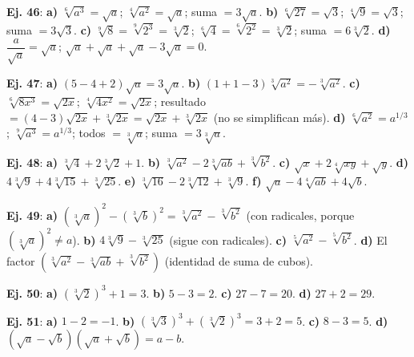 \documentclass[11pt, letterpaper]{article}
\begin{document}
\begin{tcolorbox}[answerbox, title={Bloque L — Reducción con simplificación de índice previa}]

\noindent\textbf{Ej. 46}: \textbf{a)} $\sqrt[6]{a^3}=\sqrt{a}$; $\sqrt[4]{a^2}=\sqrt{a}$; suma $=3\sqrt{a}$. \textbf{b)} $\sqrt[6]{27}=\sqrt{3}$; $\sqrt[4]{9}=\sqrt{3}$; suma $=3\sqrt{3}$. \textbf{c)} $\sqrt[9]{8}=\sqrt[9]{2^3}=\sqrt[3]{2}$; $\sqrt[6]{4}=\sqrt[6]{2^2}=\sqrt[3]{2}$; suma $=6\sqrt[3]{2}$. \textbf{d)} $\dfrac{a}{\sqrt{a}}=\sqrt{a}$; $\sqrt{a}+\sqrt{a}+\sqrt{a}-3\sqrt{a}=0$.

\medskip

\noindent\textbf{Ej. 47}: \textbf{a)} $(5-4+2)\sqrt{a}=3\sqrt{a}$. \textbf{b)} $(1+1-3)\sqrt[3]{a^2}=-\sqrt[3]{a^2}$. \textbf{c)} $\sqrt[6]{8x^3}=\sqrt{2x}$; $\sqrt[4]{4x^2}=\sqrt{2x}$; resultado $=(4-3)\sqrt{2x}+\sqrt[3]{2x}=\sqrt{2x}+\sqrt[3]{2x}$ (no se simplifican más). \textbf{d)} $\sqrt[6]{a^2}=a^{1/3}$; $\sqrt[9]{a^3}=a^{1/3}$; todos $=\sqrt[3]{a}$; suma $=3\sqrt[3]{a}$.
\end{tcolorbox}

\medskip

\begin{tcolorbox}[answerbox, title={Bloque M — Multiplicación con índices superiores}]

\noindent\textbf{Ej. 48}: \textbf{a)} $\sqrt[3]{4}+2\sqrt[3]{2}+1$. \textbf{b)} $\sqrt[3]{a^2}-2\sqrt[3]{ab}+\sqrt[3]{b^2}$. \textbf{c)} $\sqrt{x}+2\sqrt[4]{xy}+\sqrt{y}$. \textbf{d)} $4\sqrt[3]{9}+4\sqrt[3]{15}+\sqrt[3]{25}$. \textbf{e)} $\sqrt[3]{16}-2\sqrt[3]{12}+\sqrt[3]{9}$. \textbf{f)} $\sqrt{a}-4\sqrt[4]{ab}+4\sqrt{b}$.

\medskip

\noindent\textbf{Ej. 49}: \textbf{a)} $(\sqrt[3]{a})^2-(\sqrt[3]{b})^2=\sqrt[3]{a^2}-\sqrt[3]{b^2}$ (con radicales, porque $(\sqrt[3]{a})^2\neq a$). \textbf{b)} $4\sqrt[3]{9}-\sqrt[3]{25}$ (sigue con radicales). \textbf{c)} $\sqrt[5]{a^2}-\sqrt[5]{b^2}$. \textbf{d)} El factor $(\sqrt[3]{a^2}-\sqrt[3]{ab}+\sqrt[3]{b^2})$ (identidad de suma de cubos).

\medskip

\noindent\textbf{Ej. 50}: \textbf{a)} $(\sqrt[3]{2})^3+1=3$. \textbf{b)} $5-3=2$. \textbf{c)} $27-7=20$. \textbf{d)} $27+2=29$.

\medskip

\noindent\textbf{Ej. 51}: \textbf{a)} $1-2=-1$. \textbf{b)} $(\sqrt[3]{3})^3+(\sqrt[3]{2})^3=3+2=5$. \textbf{c)} $8-3=5$. \textbf{d)} $(\sqrt{a}-\sqrt{b})(\sqrt{a}+\sqrt{b})=a-b$.
\end{tcolorbox}
\end{document}
